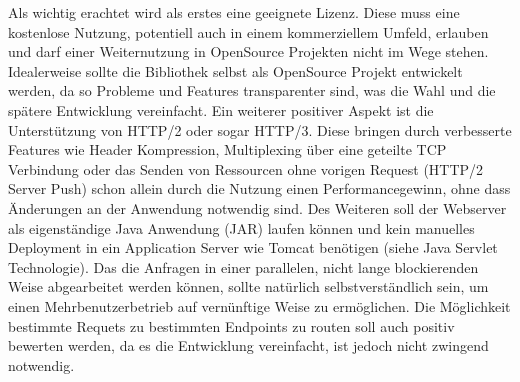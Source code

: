Als wichtig erachtet wird als erstes eine geeignete Lizenz. Diese muss eine kostenlose Nutzung, potentiell auch in einem kommerziellem Umfeld, erlauben und darf einer Weiternutzung in OpenSource Projekten nicht im Wege stehen. Idealerweise sollte die Bibliothek selbst als OpenSource Projekt entwickelt werden, da so Probleme und Features transparenter sind, was die Wahl und die spätere Entwicklung vereinfacht. Ein weiterer positiver Aspekt ist die Unterstützung von HTTP/2 oder sogar HTTP/3. Diese bringen durch verbesserte Features wie Header Kompression, Multiplexing über eine geteilte TCP Verbindung oder das Senden von Ressourcen ohne vorigen Request (HTTP/2 Server Push) schon allein durch die Nutzung einen Performancegewinn, ohne dass Änderungen an der Anwendung notwendig sind. Des Weiteren soll der Webserver als eigenständige Java Anwendung (JAR) laufen können und kein manuelles Deployment in ein Application Server wie Tomcat benötigen (siehe Java Servlet Technologie). Das die Anfragen in einer parallelen, nicht lange blockierenden Weise abgearbeitet werden können, sollte natürlich selbstverständlich sein, um einen Mehrbenutzerbetrieb auf vernünftige Weise zu ermöglichen. Die Möglichkeit bestimmte Requets zu bestimmten Endpoints zu routen soll auch positiv bewerten werden, da es die Entwicklung vereinfacht, ist jedoch nicht zwingend notwendig.

